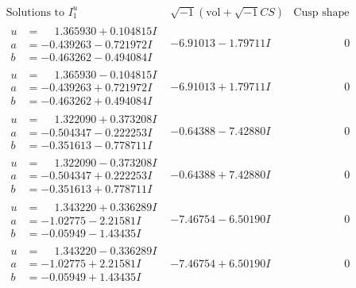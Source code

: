\documentclass[1p]{elsarticle_modified}
\theoremstyle{definition}
\newcommand{\I}{\sqrt{-1}}
\begin{document}
$$\begin{array}{c|c|c}
 \end{array}$$\newpage$$\begin{array}{c|c|c}  
\text{Solutions to }I^u_{1}& \I (\text{vol} + \sqrt{-1}CS) & \text{Cusp shape}\\
 \hline 
\begin{aligned}
u &= \phantom{-}1.365930 + 0.104815 I \\
a &= -0.439263 - 0.721972 I \\
b &= -0.463262 - 0.494084 I\end{aligned}
 & -6.91013 - 1.79711 I & \phantom{-0.000000 } 0 \\ \hline\begin{aligned}
u &= \phantom{-}1.365930 - 0.104815 I \\
a &= -0.439263 + 0.721972 I \\
b &= -0.463262 + 0.494084 I\end{aligned}
 & -6.91013 + 1.79711 I & \phantom{-0.000000 } 0 \\ \hline\begin{aligned}
u &= \phantom{-}1.322090 + 0.373208 I \\
a &= -0.504347 - 0.222253 I \\
b &= -0.351613 - 0.778711 I\end{aligned}
 & -0.64388 - 7.42880 I & \phantom{-0.000000 } 0 \\ \hline\begin{aligned}
u &= \phantom{-}1.322090 - 0.373208 I \\
a &= -0.504347 + 0.222253 I \\
b &= -0.351613 + 0.778711 I\end{aligned}
 & -0.64388 + 7.42880 I & \phantom{-0.000000 } 0 \\ \hline\begin{aligned}
u &= \phantom{-}1.343220 + 0.336289 I \\
a &= -1.02775 - 2.21581 I \\
b &= -0.05949 - 1.43435 I\end{aligned}
 & -7.46754 - 6.50190 I & \phantom{-0.000000 } 0 \\ \hline\begin{aligned}
u &= \phantom{-}1.343220 - 0.336289 I \\
a &= -1.02775 + 2.21581 I \\
b &= -0.05949 + 1.43435 I\end{aligned}
 & -7.46754 + 6.50190 I & \phantom{-0.000000 } 0 \\ \hline\begin{aligned}

\end{aligned}
\end{array}$$
\end{document}

